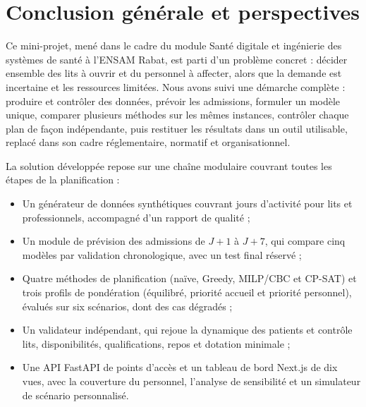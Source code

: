 \chapter*{Conclusion générale et perspectives}

\begingroup
\setlength{\parindent}{1.2em}
\setlength{\parskip}{3pt}

\indent Ce mini-projet, mené dans le cadre du module Santé digitale et ingénierie des systèmes de santé à l'ENSAM Rabat, est parti d'un problème concret : décider ensemble des lits à ouvrir et du personnel à affecter, alors que la demande est incertaine et les ressources limitées. Nous avons suivi une démarche complète : produire et contrôler des données, prévoir les admissions, formuler un modèle unique, comparer plusieurs méthodes sur les mêmes instances, contrôler chaque plan de façon indépendante, puis restituer les résultats dans un outil utilisable, replacé dans son cadre réglementaire, normatif et organisationnel.

\indent La solution développée repose sur une chaîne modulaire couvrant toutes les étapes de la planification :
\begin{itemize}
    \item Un générateur de données synthétiques couvrant \NbJours{} jours d'activité pour \NbLits{} lits et \NbAgents{} professionnels, accompagné d'un rapport de qualité ;
    \item Un module de prévision des admissions de $J+1$ à $J+7$, qui compare cinq modèles par validation chronologique, avec un test final réservé ;
    \item Quatre méthodes de planification (naïve, Greedy, MILP/CBC et CP-SAT) et trois profils de pondération (équilibré, priorité accueil et priorité personnel), évalués sur six scénarios, dont des cas dégradés ;
    \item Un validateur indépendant, qui rejoue la dynamique des patients et contrôle lits, disponibilités, qualifications, repos et dotation minimale ;
    \item Une API FastAPI de \NbEndpoints{} points d'accès et un tableau de bord Next.js de dix vues, avec la couverture du personnel, l'analyse de sensibilité et un simulateur de scénario personnalisé.
\end{itemize}

